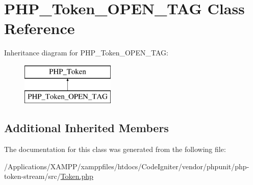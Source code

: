 \hypertarget{class_p_h_p___token___o_p_e_n___t_a_g}{}\section{P\+H\+P\+\_\+\+Token\+\_\+\+O\+P\+E\+N\+\_\+\+T\+AG Class Reference}
\label{class_p_h_p___token___o_p_e_n___t_a_g}
Inheritance diagram for P\+H\+P\+\_\+\+Token\+\_\+\+O\+P\+E\+N\+\_\+\+T\+AG\+:\begin{figure}[H]
\begin{center}
\leavevmode
\includegraphics[height=2.000000cm]{class_p_h_p___token___o_p_e_n___t_a_g}
\end{center}
\end{figure}
\subsection*{Additional Inherited Members}


The documentation for this class was generated from the following file\+:\begin{DoxyCompactItemize}
\item 
/\+Applications/\+X\+A\+M\+P\+P/xamppfiles/htdocs/\+Code\+Igniter/vendor/phpunit/php-\/token-\/stream/src/\mbox{\hyperlink{_token_8php}{Token.\+php}}\end{DoxyCompactItemize}
